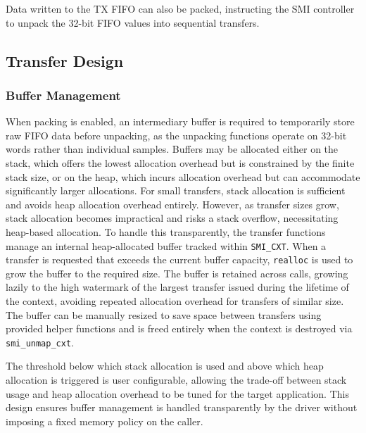 \documentclass[final]{cmpreport}
\begin{document}
Data written to the TX FIFO can also be packed, instructing the SMI controller to unpack the 32-bit FIFO values into sequential transfers.


\subsection{Transfer Design}

\subsubsection{Buffer Management}
When packing is enabled, an intermediary buffer is required to temporarily store raw FIFO data before unpacking, as the unpacking functions operate on 32-bit words rather than individual samples. Buffers may be allocated either on the stack, which offers the lowest allocation overhead but is constrained by the finite stack size, or on the heap, which incurs allocation overhead but can accommodate significantly larger allocations. For small transfers, stack allocation is sufficient and avoids heap allocation overhead entirely. However, as transfer sizes grow, stack allocation becomes impractical and risks a stack overflow, necessitating heap-based allocation. To handle this transparently, the transfer functions manage an internal heap-allocated buffer tracked within \texttt{SMI\_CXT}. When a transfer is requested that exceeds the current buffer capacity, \texttt{realloc} is used to grow the buffer to the required size. The buffer is retained across calls, growing lazily to the high watermark of the largest transfer issued during the lifetime of the context, avoiding repeated allocation overhead for transfers of similar size. The buffer can be manually resized to save space between transfers using provided helper functions and is freed entirely when the context is destroyed via \texttt{smi\_unmap\_cxt}.

The threshold below which stack allocation is used and above which heap allocation is triggered is user configurable, allowing the trade-off between stack usage and heap allocation overhead to be tuned for the target application. This design ensures buffer management is handled transparently by the driver without imposing a fixed memory policy on the caller.
\end{document}
